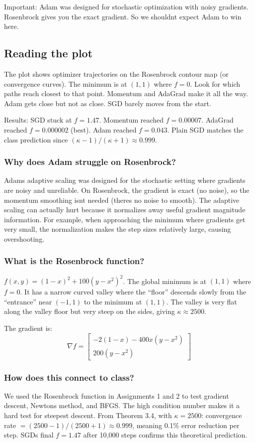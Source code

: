 \documentclass[11pt, letterpaper]{article}
\begin{document}
Important: Adam was designed for stochastic optimization with noisy gradients. Rosenbrock gives you the exact gradient. So we shouldnt expect Adam to win here.

\subsection{Reading the plot}
The plot shows optimizer trajectories on the Rosenbrock contour map (or convergence curves). The minimum is at $(1, 1)$ where $f = 0$. Look for which paths reach closest to that point. Momentum and AdaGrad make it all the way. Adam gets close but not as close. SGD barely moves from the start.

Results: SGD stuck at $f = 1.47$. Momentum reached $f = 0.00007$. AdaGrad reached $f = 0.000002$ (best). Adam reached $f = 0.043$. Plain SGD matches the class prediction since $(\kappa-1)/(\kappa+1) \approx 0.999$.

\begin{deepdive}
\subsubsection{Why does Adam struggle on Rosenbrock?}
Adams adaptive scaling was designed for the stochastic setting where gradients are noisy and unreliable. On Rosenbrock, the gradient is exact (no noise), so the momentum smoothing isnt needed (theres no noise to smooth). The adaptive scaling can actually hurt because it normalizes away useful gradient magnitude information. For example, when approaching the minimum where gradients get very small, the normalization makes the step sizes relatively large, causing overshooting.

\subsubsection{What is the Rosenbrock function?}
$f(x,y) = (1-x)^2 + 100(y - x^2)^2$. The global minimum is at $(1, 1)$ where $f = 0$. It has a narrow curved valley where the ``floor'' descends slowly from the ``entrance'' near $(-1, 1)$ to the minimum at $(1, 1)$. The valley is very flat along the valley floor but very steep on the sides, giving $\kappa \approx 2500$.

The gradient is:
$$\nabla f = \begin{bmatrix} -2(1-x) - 400x(y - x^2) \\ 200(y - x^2) \end{bmatrix}$$

\subsubsection{How does this connect to class?}
We used the Rosenbrock function in Assignments 1 and 2 to test gradient descent, Newtons method, and BFGS. The high condition number makes it a hard test for steepest descent. From Theorem 3.4, with $\kappa = 2500$: convergence rate $= (2500-1)/(2500+1) \approx 0.999$, meaning 0.1\% error reduction per step. SGDs final $f = 1.47$ after 10,000 steps confirms this theoretical prediction.
\end{deepdive}
\end{document}
